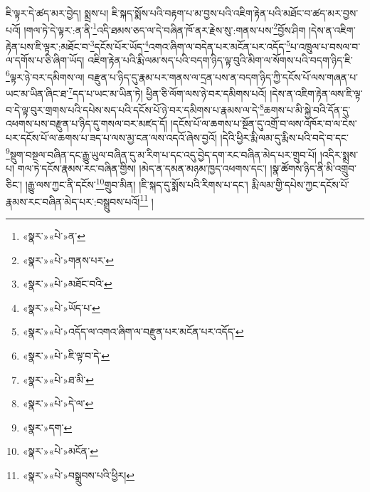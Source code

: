ཇི་ལྟར་དེ་ཚད་མར་བྱེད། སྨྲས་པ། ཇི་སྐད་སྨོས་པའི་བརྟག་པ་མ་བྱས་པའི་འཇིག་རྟེན་པའི་མཐོང་བ་ཚད་མར་བྱས་པའོ། །གལ་ཏེ་དེ་ལྟར་:ན་ནི་\footnote{«སྣར་»«པེ་»ན་}འདི་ཐམས་ཅད་ལ་དེ་བཞིན་ཁོ་ནར་རྗེས་སུ་:གནས་པས་\footnote{«སྣར་»«པེ་»གནས་པར་}བྱོས་ཤིག །དེས་ན་འཇིག་རྟེན་པས་ཇི་ལྟར་:མཐོང་བ་\footnote{«སྣར་»«པེ་»མཐོང་བའི་}དངོས་པོར་ཡོད་\footnote{«སྣར་»«པེ་»ཡོད་པ་}འགའ་ཞིག་ལ་བདེན་པར་མངོན་པར་འདོད་\footnote{«སྣར་»«པེ་»འདོད་ལ་འགའ་ཞིག་ལ་བརྫུན་པར་མངོན་པར་འདོད་}པ་འཁྲུལ་པ་བསལ་བ་ལ་དགོས་པ་ཅི་ཞིག་ཡོད། འཇིག་རྟེན་པའི་རྨི་ལམ་སད་པའི་བདག་ཉིད་ལྟ་བུའི་མིག་ལ་སོགས་པའི་བདག་ཉིད་ཇི་\footnote{«སྣར་»«པེ་»ཇི་ལྟ་བ་དེ་}ལྟར་ཉེ་བར་དམིགས་ལ། བརྫུན་པ་ཉིད་དུ་རྣམ་པར་གནས་ལ་དྲན་པས་ན་བདག་ཉིད་ཀྱི་དངོས་པོ་ལས་གཞན་པ་ཡང་མ་ཡིན་ཞིང་ཐ་\footnote{«སྣར་»«པེ་»ཐ་མི་}དད་པ་ཡང་མ་ཡིན་ཏེ། ཕྱིན་ཅི་ལོག་ལས་ཉེ་བར་དམིགས་པའོ། །དེས་ན་འཇིག་རྟེན་ལས་ཇི་ལྟ་བ་དེ་ལྟ་བུར་གྲགས་པའི་དཔེས་སད་པའི་དངོས་པོ་ཉེ་བར་དམིགས་པ་རྣམས་ལ་དེ་\footnote{«སྣར་»«པེ་»དེ་ལ་}ཆགས་པ་མི་སྐྱེ་བའི་དོན་དུ་འཕགས་པས་བརྫུན་པ་ཉིད་དུ་གསལ་བར་མཛད་དོ། །དངོས་པོ་ལ་ཆགས་པ་སྔོན་དུ་འགྲོ་བ་ལས་འཁོར་བ་ལ་ངེས་པར་དངོས་པོ་ལ་ཆགས་པ་ཟད་པ་ལས་མྱ་ངན་ལས་འདའོ་ཞེས་བྱའོ། །དེའི་ཕྱིར་རྨི་ལམ་དུ་རྨིས་པའི་བདེ་བ་དང་\footnote{«སྣར་»དག་}སྡུག་བསྔལ་བཞིན་དང་རྒྱུ་ཡུལ་བཞིན་དུ་མ་རིག་པ་དང་འདུ་བྱེད་དག་རང་བཞིན་མེད་པར་གྲུབ་པོ། །འདིར་སྨྲས་པ། གལ་ཏེ་དངོས་རྣམས་རང་བཞིན་གྱིས། །མེད་ན་དམན་མཉམ་ཁྱད་འཕགས་དང་། །སྣ་ཚོགས་ཉིད་ནི་མི་འགྲུབ་ཅིང་། །རྒྱུ་ལས་ཀྱང་ནི་དངོས་\footnote{«སྣར་»«པེ་»མངོན་}གྲུབ་མིན། །ཇི་སྐད་དུ་སྨོས་པའི་རིགས་པ་དང་། རྨི་ལམ་གྱི་དཔེས་ཀྱང་དངོས་པོ་རྣམས་རང་བཞིན་མེད་པར་:བསྒྲུབས་པའོ།\footnote{«སྣར་»«པེ་»བསྒྲུབས་པའི་ཕྱིར།} །
